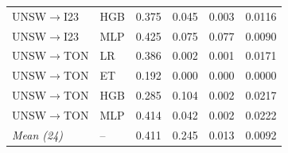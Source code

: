\begin{table}[!htbp]
\begin{tabular}{llrrrr}
UNSW$\to$I23 & HGB & 0.375 & 0.045 & 0.003 & 0.0116 \\
UNSW$\to$I23 & MLP & 0.425 & 0.075 & 0.077 & 0.0090 \\
\midrule
UNSW$\to$TON & LR & 0.386 & 0.002 & 0.001 & 0.0171 \\
UNSW$\to$TON & ET & 0.192 & 0.000 & 0.000 & 0.0000 \\
UNSW$\to$TON & HGB & 0.285 & 0.104 & 0.002 & 0.0217 \\
UNSW$\to$TON & MLP & 0.414 & 0.042 & 0.002 & 0.0222 \\
\midrule
\emph{Mean (24)} & -- & 0.411 & 0.245 & 0.013 & 0.0092 \\
\bottomrule
\end{tabular}
\end{table}
